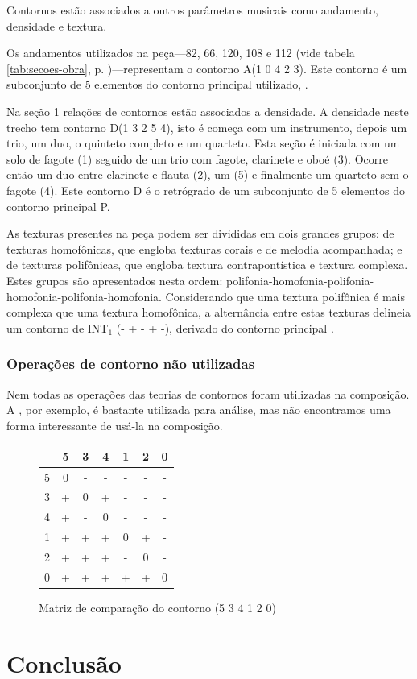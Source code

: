 Contornos estão associados a outros parâmetros musicais como
andamento, densidade e textura.

Os andamentos utilizados na peça---82, 66, 120, 108 e 112 (vide tabela
\ref{tab:secoes-obra}, p. \pageref{tab:secoes-obra})---representam o
contorno A(1 0 4 2 3). Este contorno é um subconjunto de 5 elementos
do contorno principal utilizado, \contpr{}.

Na seção 1 relações de contornos estão associados a densidade. A
densidade neste trecho tem contorno D(1 3 2 5 4), isto é começa com um
instrumento, depois um trio, um duo, o quinteto completo e um
quarteto. Esta seção é iniciada com um solo de fagote (1) seguido de
um trio com fagote, clarinete e oboé (3). Ocorre então um duo entre
clarinete e flauta (2), um  (5) e finalmente um quarteto
sem o fagote (4). Este contorno D é o retrógrado de um subconjunto de
5 elementos do contorno principal P.

As texturas presentes na peça podem ser divididas em dois grandes
grupos: de texturas homofônicas, que engloba texturas corais e de
melodia acompanhada; e de texturas polifônicas, que engloba textura
contrapontística e textura complexa. Estes grupos são apresentados
nesta ordem:
polifonia-homofonia-polifonia-homofonia-polifonia-homofonia. Considerando
que uma textura polifônica é mais complexa que uma textura homofônica,
a alternância entre estas texturas delineia um contorno de INT$_1$ (-
+ - + -), derivado do contorno principal \contpr{}.

\subsection{Operações de contorno não utilizadas}
\label{sec:oper-de-cont}

Nem todas as operações das teorias de contornos foram utilizadas na
composição. A , por exemplo, é bastante utilizada para
análise, mas não encontramos uma forma interessante de usá-la na
composição.

\begin{figure}
  \centering
  \begin{tabular}{r|cccccc}
      & 5 & 3 & 4 & 1 & 2 & 0 \\
      \hline
    5 & 0 & - & - & - & - & - \\
    3 & + & 0 & + & - & - & - \\
    4 & + & - & 0 & - & - & - \\
    1 & + & + & + & 0 & + & - \\
    2 & + & + & + & - & 0 & - \\
    0 & + & + & + & + & + & 0
  \end{tabular}
  \caption{Matriz de comparação do contorno (5 3 4 1 2 0)}
  \label{fig:matriz-534120}
\end{figure}


\chapter{Conclusão}
\label{cha:conclusao}
